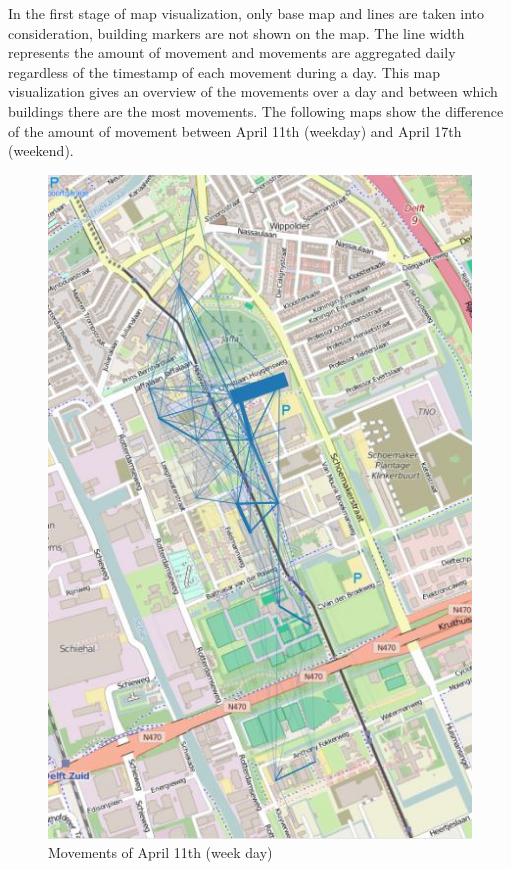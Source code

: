 In the first stage of map visualization, only base map and lines are taken into consideration, building markers are not shown on the map. The line width represents the amount of movement and movements are aggregated daily regardless of the timestamp of each movement during a day. This map visualization gives an overview of the movements over a day and between which buildings there are the most movements. The following maps show the difference of the amount of movement between April 11th (weekday) and April 17th (weekend).
\graphicspath{ {pics/} }
\begin{figure}[H]
\includegraphics[scale=0.7,left]{pic1}
\captionsetup{justification=centering}
\caption{Movements of April 11th (week day)}
\endminipage\hfill
{}

\end{figure}

